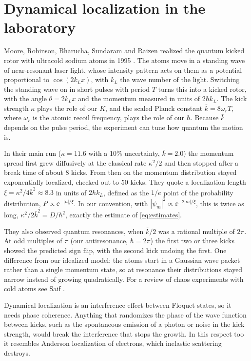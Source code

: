\section{Dynamical localization in the laboratory}
\label{sec:experiments}

Moore, Robinson, Bharucha, Sundaram and Raizen realized the quantum kicked rotor with ultracold sodium
atoms in 1995 \cite{Moore1995}. The atoms move in a standing wave of near-resonant laser light, whose
intensity pattern acts on them as a potential proportional to $\cos(2k_L x)$, with $k_L$ the wave number of
the light. Switching the standing wave on in short pulses with period $T$ turns this into a kicked rotor, with
the angle $\theta = 2k_L x$ and the momentum measured in units of $2\hbar k_L$. The kick strength $\kappa$ plays
the role of our $K$, and the scaled Planck constant $\bar k = 8\omega_r T$, where $\omega_r$ is the atomic
recoil frequency, plays the role of our $\hbar$. Because $\bar k$ depends on the pulse period, the experiment
can tune how quantum the motion is.

In their main run ($\kappa = 11.6$ with a 10\% uncertainty, $\bar k = 2.0$) the momentum spread first grew
diffusively at the classical rate $\kappa^2/2$ and then stopped after a break time of about 8 kicks. From then
on the momentum distribution stayed exponentially localized, checked out to 50 kicks. They quote a
localization length $\xi = \kappa^2/4\bar k^2 \approx 8.3$ in units of $2\hbar k_L$, defined as the $1/e$ point
of the probability distribution, $P \propto \ee^{-|n|/\xi}$. In our convention, with $|\psi_m|^2 \propto
\ee^{-2|m|/\xi}$, this is twice as long, $\kappa^2/2\bar k^2 = D/\hbar^2$, exactly the estimate of
\cref{eq:estimates}.

They also observed quantum resonances, when $\bar k/2$ was a rational multiple of $2\pi$. At odd multiples of
$\pi$ (our antiresonance, $\hbar = 2\pi$) the first two or three kicks showed the predicted sign flip, with the
second kick undoing the first. One difference from our idealized model: the atoms start in a Gaussian wave
packet rather than a single momentum state, so at resonance their distributions stayed narrow instead of
growing quadratically. For a review of chaos experiments with cold atoms see Saif \cite{Saif2005}.

Dynamical localization is an interference effect between Floquet states, so it needs phase coherence.
Anything that randomizes the phase of the wave function between kicks, such as the spontaneous emission of a
photon or noise in the kick strength, would break the interference that stops the growth. In this respect too
it resembles Anderson localization of electrons, which inelastic scattering destroys.

